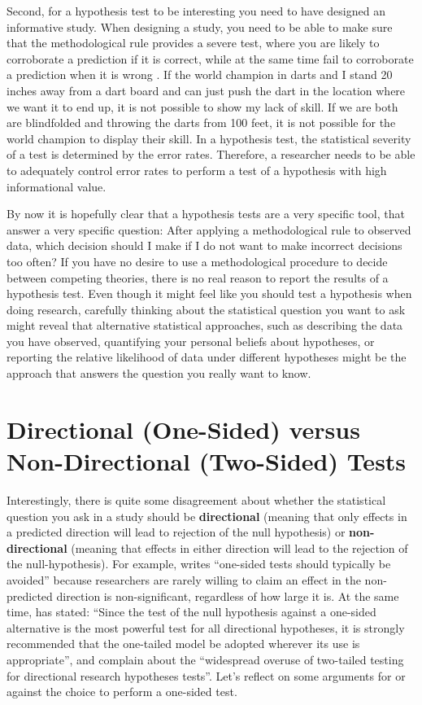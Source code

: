 \documentclass[
  oneside]{book}
\begin{document}
Second, for a hypothesis test to be interesting you need to have designed an informative study. When designing a study, you need to be able to make sure that the methodological rule provides a severe test, where you are likely to corroborate a prediction if it is correct, while at the same time fail to corroborate a prediction when it is wrong \citep{mayo_statistical_2018}. If the world champion in darts and I stand 20 inches away from a dart board and can just push the dart in the location where we want it to end up, it is not possible to show my lack of skill. If we are both are blindfolded and throwing the darts from 100 feet, it is not possible for the world champion to display their skill. In a hypothesis test, the statistical severity of a test is determined by the error rates. Therefore, a researcher needs to be able to adequately control error rates to perform a test of a hypothesis with high informational value.

By now it is hopefully clear that a hypothesis tests are a very specific tool, that answer a very specific question: After applying a methodological rule to observed data, which decision should I make if I do not want to make incorrect decisions too often? If you have no desire to use a methodological procedure to decide between competing theories, there is no real reason to report the results of a hypothesis test. Even though it might feel like you should test a hypothesis when doing research, carefully thinking about the statistical question you want to ask might reveal that alternative statistical approaches, such as describing the data you have observed, quantifying your personal beliefs about hypotheses, or reporting the relative likelihood of data under different hypotheses might be the approach that answers the question you really want to know.

\hypertarget{onesided}{%
\section{Directional (One-Sided) versus Non-Directional (Two-Sided) Tests}\label{onesided}}

Interestingly, there is quite some disagreement about whether the statistical question you ask in a study should be \textbf{directional} (meaning that only effects in a predicted direction will lead to rejection of the null hypothesis) or \textbf{non-directional} (meaning that effects in either direction will lead to the rejection of the null-hypothesis). For example, \citet{baguley_serious_2012} writes ``one-sided tests should typically be avoided'' because researchers are rarely willing to claim an effect in the non-predicted direction is non-significant, regardless of how large it is. At the same time, \citet{jones_test_1952} has stated: ``Since the test of the null hypothesis against a one-sided alternative is the most powerful test for all directional hypotheses, it is strongly recommended that the one-tailed model be adopted wherever its use is appropriate'', and \citet{cho_is_2013} complain about the ``widespread overuse of two-tailed testing for directional research hypotheses tests''. Let's reflect on some arguments for or against the choice to perform a one-sided test.
\end{document}
